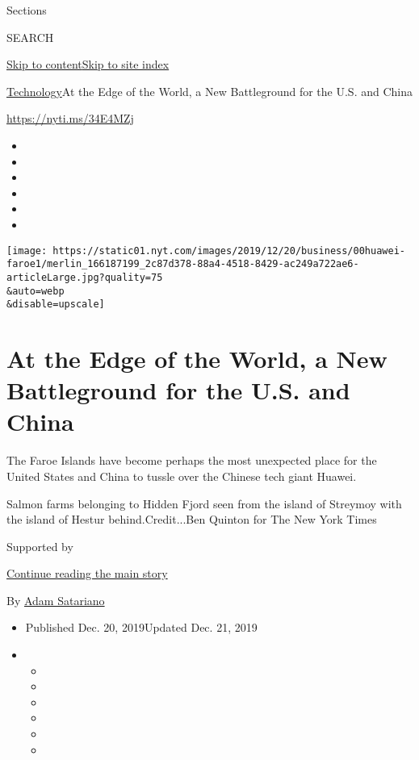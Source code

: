 Sections

SEARCH

\protect\hyperlink{site-content}{Skip to
content}\protect\hyperlink{site-index}{Skip to site index}

\href{/section/technology}{Technology}\textbar{}At the Edge of the
World, a New Battleground for the U.S. and China

\url{https://nyti.ms/34E4MZj}

\begin{itemize}
\item
\item
\item
\item
\item
\item
\end{itemize}

\texttt{[image: https://static01.nyt.com/images/2019/12/20/business/00huawei-faroe1/merlin\_166187199\_2c87d378-88a4-4518-8429-ac249a722ae6-articleLarge.jpg?quality=75\\\&auto=webp\\\&disable=upscale]}

\hypertarget{at-the-edge-of-the-world-a-new-battleground-for-the-us-and-china}{%
\section{At the Edge of the World, a New Battleground for the U.S. and
China}\label{at-the-edge-of-the-world-a-new-battleground-for-the-us-and-china}}

The Faroe Islands have become perhaps the most unexpected place for the
United States and China to tussle over the Chinese tech giant Huawei.

Salmon farms belonging to Hidden Fjord seen from the island of Streymoy
with the island of Hestur behind.Credit...Ben Quinton for The New York
Times

Supported by

\protect\hyperlink{after-sponsor}{Continue reading the main story}

By \href{https://www.nytimes.com/by/adam-satariano}{Adam Satariano}

\begin{itemize}
\item
  Published Dec. 20, 2019Updated Dec. 21, 2019
\item
  \begin{itemize}
  \item
  \item
  \item
  \item
  \item
  \item
  \end{itemize}
\end{itemize}

